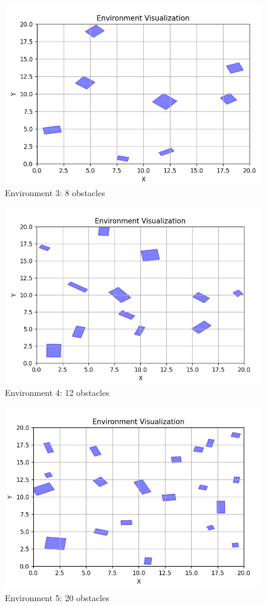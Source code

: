 \documentclass{article}
\begin{document}
\begin{figure} [H]
    \centering
    \includegraphics[width=0.7\linewidth]{latex_media/env3.jpg}
    \caption{Environment 3: 8 obstacles}
\end{figure}

\begin{figure} [H]
    \centering
    \includegraphics[width=0.7\linewidth]{latex_media/env4.jpg}
    \caption{Environment 4: 12 obstacles}
\end{figure}

\begin{figure} [H]
    \centering
    \includegraphics[width=0.7\linewidth]{latex_media/env5.jpg}
    \caption{Environment 5: 20 obstacles}
\end{figure}
\end{document}
